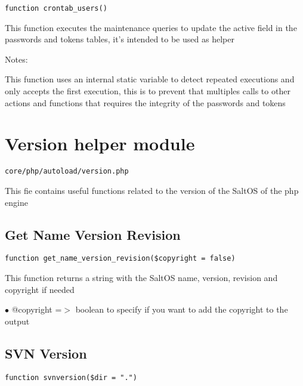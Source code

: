 \documentclass[a4paper]{book}
\begin{document}
\begin{lstlisting}
function crontab_users()
\end{lstlisting}

This function executes the maintenance queries to update the active field
in the passwords and tokens tables, it's intended to be used as helper

Notes:

This function uses an internal static variable to detect repeated executions
and only accepts the first execution, this is to prevent that multiples calls
to other actions and functions that requires the integrity of the passwords
and tokens

\hypertarget{toc272}{}
\section{Version helper module}

\begin{lstlisting}
core/php/autoload/version.php
\end{lstlisting}

This fie contains useful functions related to the version of the SaltOS of the php engine

\hypertarget{toc273}{}
\subsection{Get Name Version Revision}

\begin{lstlisting}
function get_name_version_revision($copyright = false)
\end{lstlisting}

This function returns a string with the SaltOS name, version, revision and
copyright if needed

\begin{compactitem}
\item[\color{myblue}$\bullet$] @copyright =$>$ boolean to specify if you want to add the copyright to the output
\end{compactitem}

\hypertarget{toc274}{}
\subsection{SVN Version}

\begin{lstlisting}
function svnversion($dir = ".")
\end{lstlisting}
\end{document}
